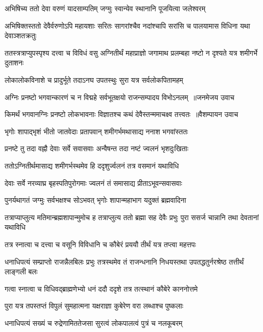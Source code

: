 \twolineshloka
{अभिषिच्य ततो देवा वरुणं यादसाम्पतिम्}
{जग्मुः स्वान्येव स्थानानि पूजयित्वा जलेश्वरम्}


\threelineshloka
{अभिषिक्तस्ततो देवैर्वरुणोऽपि महायशाः}
{सरितः सागरांश्चैव नदांश्चापि सरांसि च}
{पालयामास विधिना यथा देवाञ्शतक्रतुः}


\threelineshloka
{ततस्त्रत्राप्युपस्पृश्य दत्त्वा च विविधं वसु}
{अग्नितीर्थं महाप्राज्ञो जगामाथ प्रलम्बहा}
{नष्टो न दृश्यते यत्र शमीगर्भे दुताशनः}


\twolineshloka
{लोकालोकविनाशे च प्रादुर्भूते तदाऽनघ}
{उपतस्थुः सुरा यत्र सर्वलोकपितामहम्}


\threelineshloka
{अग्निः प्रनष्टो भगवान्कारणं च न विद्महे}
{सर्वभूतक्षयो राजन्सम्पादय विभोऽनलम् ॥जनमेजय उवाच}
{}


\threelineshloka
{किमर्थं भगवानग्निः प्रनष्टो लोकभावनाः}
{विज्ञातश्च कथं देवैस्तन्ममाचक्ष्व तत्त्वतः ॥वैशम्पायन उवाच}
{}


\twolineshloka
{भृगोः शापाद्भृशं भीतो जातवेदाः प्रतापवान्}
{शमीगर्भमथासाद्य ननाश भगवांस्ततः}


\twolineshloka
{प्रनष्टे तु तदा वह्नौ देवाः सर्वे सवासवाः}
{अन्वैषन्त तदा नष्टं ज्वलनं भृशदुःखिताः}


\twolineshloka
{ततोऽग्नितीर्थमासाद्य शमीगर्भस्थमेव हि}
{ददृशुर्ज्वलनं तत्र वसमानं यथाविधि}


\twolineshloka
{देवाः सर्वे नरव्याघ्र बृहस्पतिपुरोगमाः}
{ज्वलनं तं समासाद्य प्रीताऽभूवन्सवासवाः}


\twolineshloka
{पुनर्यथागतं जग्मुः सर्वभक्षश्च सोऽभवत्}
{भृगोः शापान्महाभाग यदुक्तं ब्रह्मवादिना}


तत्राप्याप्लुत्य मतिमान्ब्रह्मशापान्मुमोच ह
\twolineshloka
{तत्राप्लुत्य ततो ब्रह्मा सह देवैः प्रभुः पुरा}
{ससर्ज चान्नानि तथा देवतानां यथाविधि}


\twolineshloka
{तत्र स्नात्वा च दत्त्वा च वसूनि विविधानि च}
{कौबेरं प्रययौ तीर्थं यत्र तप्त्वा महत्तपः}


धनाधिपत्यं सम्प्राप्तो राजन्नैलबिलः प्रभुः
\twolineshloka
{तत्रस्थमेव तं राजन्धनानि निधयस्तथा}
{उपतद्धतुर्नरश्रेष्ठ तत्तीर्थं लाङ्गली बलः}


\twolineshloka
{गत्वा स्नात्वा च विधिवद्ब्राह्मणेभ्यो धनं ददौ}
{ददृशे तत्र तत्स्थानं कौबेरे काननोत्तमे}


\twolineshloka
{पुरा यत्र तपस्तप्तं विपुलं सुमहात्मना}
{यक्षराज्ञा कुबेरेण वरा लब्धाश्च पुष्कलाः}


\twolineshloka
{धनाधिपत्यं सख्यं च रुद्रेणामिततेजसा}
{सुरत्वं लोकपालत्वं पुत्रं च नलकूबरम्}


